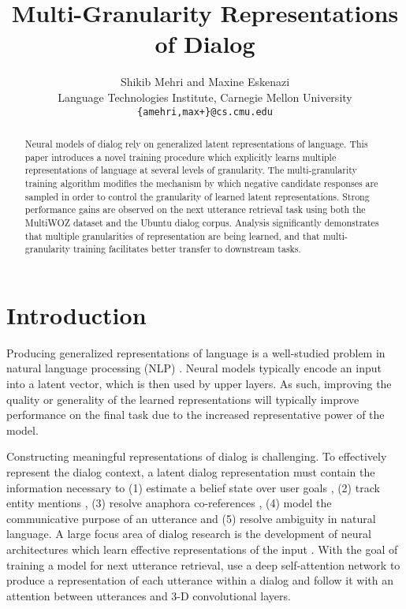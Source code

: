 \documentclass[11pt,a4paper]{article}
\title{Multi-Granularity Representations of Dialog}
\author{Shikib Mehri and Maxine Eskenazi \\
  Language Technologies Institute, Carnegie Mellon University \\
  {\tt \{amehri,max+\}@cs.cmu.edu}}
\date{}
\begin{document}
\maketitle
\begin{abstract}
Neural models of dialog rely on generalized latent representations of language. This paper introduces a novel training procedure which explicitly learns multiple representations of language at several levels of granularity. The multi-granularity training algorithm modifies the mechanism by which negative candidate responses are sampled in order to control the granularity of learned latent representations. Strong performance gains are observed on the next utterance retrieval task using both the MultiWOZ dataset and the Ubuntu dialog corpus. Analysis significantly demonstrates that multiple granularities of representation are being learned, and that multi-granularity training facilitates better transfer to downstream tasks.

\end{abstract}

\section{Introduction}
Producing generalized representations of language is a well-studied problem in natural language processing (NLP) \citep{montague1973proper,davidson2012semantics}. Neural models typically encode an input into a latent vector, which is then used by upper layers. As such, improving the quality or generality of the learned representations will typically improve performance on the final task due to the increased representative power of the model. 

Constructing meaningful representations of dialog is challenging. To effectively represent the dialog context, a latent dialog representation must contain the information necessary to (1) estimate a belief state over user goals \citep{williams2013dialog}, (2) track entity mentions \citep{zhao2017generative}, (3) resolve anaphora co-references \citep{mitkov2014anaphora}, (4) model the communicative purpose of an utterance \citep{core1997coding} and (5) resolve ambiguity in natural language. A large focus area of dialog research is the development of neural architectures which learn effective representations of the input \citep{zhou2016multi,wu2016sequential,zhou2018multi}. With the goal of training a model for next utterance retrieval, \citet{zhou2018multi} use a deep self-attention network to produce a representation of each utterance within a dialog and follow it with an attention between utterances and 3-D convolutional layers. 
\end{document}

